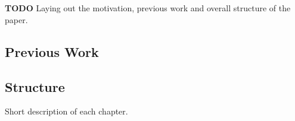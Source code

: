 \chapter{\bevezetes}

\textbf{TODO}
Laying out the motivation, previous work and overall structure of the paper.
\section{Previous Work}

\section{Structure}
Short description of each chapter.
